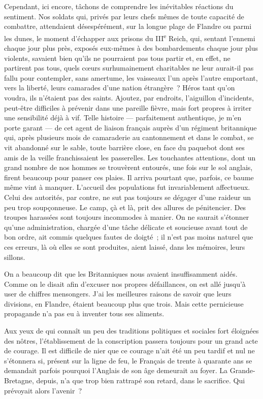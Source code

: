 \documentclass[french,twoside]{book} %
\begin{document}
Cependant, ici encore, tâchons de comprendre les inévitables réactions du sentiment. Nos soldats qui, privés par leurs chefs mêmes de toute capacité de combattre, attendaient désespérément, sur la longue plage de Flandre ou parmi les dunes, le moment d’échapper aux prisons du III\textsuperscript{e} Reich, qui, sentant l’ennemi chaque jour plus près, exposés eux-mêmes à des bombardements chaque jour plus violents, savaient bien qu’ils ne pourraient pas tous partir et, en effet, ne partirent pas tous, quels cœurs surhumainement charitables ne leur aurait-il pas fallu pour contempler, sans amertume, les vaisseaux l’un après l’autre emportant, vers la liberté, leurs camarades d’une nation étrangère ? Héros tant qu’on   voudra, ils n’étaient pas des saints. Ajoutez, par endroits, l’aiguillon d’incidents, peut-être difficiles à prévenir dans une pareille fièvre, mais fort propres à irriter une sensibilité déjà à vif. Telle histoire — parfaitement authentique, je m’en porte garant — de cet agent de liaison français auprès d’un régiment britannique qui, après plusieurs mois de camaraderie au cantonnement et dans le combat, se vit abandonné sur le sable, toute barrière close, en face du paquebot dont ses amis de la veille franchissaient les passerelles. Les touchantes attentions, dont un grand nombre de nos hommes se trouvèrent entourés, une fois sur le sol anglais, firent beaucoup pour panser ces plaies. Il arriva pourtant que, parfois, ce baume même vint à manquer. L’accueil des populations fut invariablement affectueux. Celui des autorités, par contre, ne sut pas toujours se dégager d’une raideur un peu trop soupçonneuse. Le camp, çà et là, prit des allures de pénitencier. Des troupes harassées sont toujours incommodes à manier. On ne saurait s’étonner qu’une administration, chargée d’une tâche délicate et soucieuse avant tout de bon ordre, ait commis quelques fautes de doigté ; il n’est pas moins naturel que ces erreurs, là où elles se sont produites, aient laissé, dans les mémoires, leurs sillons.\par
On a beaucoup dit que les Britanniques nous avaient insuffisamment aidés. Comme on le disait afin d’excuser nos propres défaillances, on est allé jusqu’à user de chiffres mensongers. J’ai les meilleures raisons de savoir que leurs divisions, en Flandre, étaient beaucoup plus que trois. Mais cette pernicieuse propagande n’a pas eu à inventer tous ses aliments.\par
Aux yeux de qui connaît un peu des traditions politiques et sociales fort éloignées des nôtres, l’établissement de la conscription passera toujours pour un grand acte de courage. Il est difficile de nier que   ce courage n’ait été un peu tardif et nul ne s’étonnera si, présent sur la ligne de feu, le Français de trente à quarante ans se demandait parfois pourquoi l’Anglais de son âge demeurait au foyer. La Grande-Bretagne, depuis, n’a que trop bien rattrapé son retard, dans le sacrifice. Qui prévoyait alors l’avenir ?\par
\end{document}
